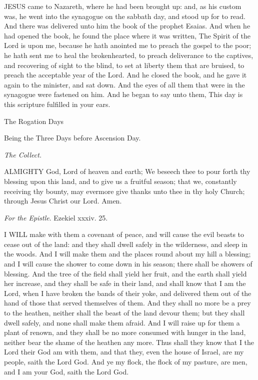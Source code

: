 JESUS
came to Nazareth, where he had been brought up: and, as his custom was,
he went into the synagogue on the sabbath day, and stood up for to read.
And there was delivered unto him the book of the prophet Esaias. And when
he had opened the book, he found the place where it was written, The Spirit
of the Lord is upon me, because he hath anointed me to preach the gospel
to the poor; he hath sent me to heal the brokenhearted, to preach deliverance
to the captives, and recovering of sight to the blind, to set at liberty
them that are bruised, to preach the acceptable year of the Lord. And
he closed the book, and he gave it again to the minister, and sat down.
And the eyes of all them that were in the synagogue were fastened on him.
And he began to say unto them, This day is this scripture fulfilled in
your ears.

The Rogation
Days

Being
the Three Days before Ascension Day.

\emph{The
Collect.}

ALMIGHTY
God, Lord of heaven and earth; We beseech thee to pour forth thy blessing
upon this land, and to give us a fruitful season; that we, constantly
receiving thy bounty, may evermore give thanks unto thee in thy holy Church;
through Jesus Christ our Lord. Amen.

\emph{For the Epistle}. Ezekiel xxxiv. 25.

I WILL make with them a
covenant of peace, and will cause the evil beasts to cease out of the
land: and they shall dwell safely in the wilderness, and sleep in the
woods. And I will make them and the places round about my hill a blessing;
and I will cause the shower to come down in his season; there shall be
showers of blessing. And the tree of the field shall yield her fruit,
and the earth shall yield her increase, and they shall be safe in their
land, and shall know that I am the Lord, when I have broken the bands
of their yoke, and delivered them out of the hand of those that served
themselves of them. And they shall no more be a prey to the heathen, neither
shall the beast of the land devour them; but they shall dwell safely,
and none shall make them afraid. And I will raise up for them a plant
of renown, and they shall be no more consumed with hunger in the land,
neither bear the shame of the heathen any more. Thus shall they know that
I the Lord their God am with them, and that they, even the house of Israel,
are my people, saith the Lord God. And ye my flock, the flock of my pasture,
are men, and I am your God, saith the Lord God.

